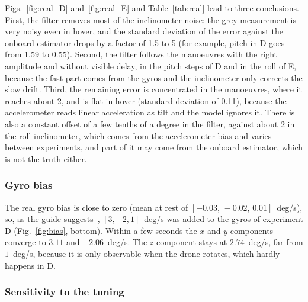 \documentclass[11pt,a4paper]{article}
\begin{document}
Figs.~\ref{fig:real_D} and~\ref{fig:real_E} and Table~\ref{tab:real} lead to three conclusions.
First, the filter removes most of the inclinometer noise: the grey measurement is very noisy even in hover, and the standard deviation of the error against the onboard estimator drops by a factor of 1.5 to 5 (for example, pitch in D goes from 1.59\textdegree{} to 0.55\textdegree).
Second, the filter follows the manoeuvres with the right amplitude and without visible delay, in the pitch steps of D and in the roll of E, because the fast part comes from the gyros and the inclinometer only corrects the slow drift.
Third, the remaining error is concentrated in the manoeuvres, where it reaches about 2\textdegree, and is flat in hover (standard deviation of 0.11\textdegree), because the accelerometer reads linear acceleration as tilt and the model ignores it.
There is also a constant offset of a few tenths of a degree in the filter, against about 2\textdegree{} in the roll inclinometer, which comes from the accelerometer bias and varies between experiments, and part of it may come from the onboard estimator, which is not the truth either.

\subsubsection{Gyro bias}

The real gyro bias is close to zero (mean at rest of $[-0.03,\,-0.02,\,0.01]$~deg/s), so, as the guide suggests~\cite{guia}, $[3,-2,1]$~deg/s was added to the gyros of experiment D (Fig.~\ref{fig:bias}, bottom).
Within a few seconds the $x$ and $y$ components converge to $3.11$ and $-2.06$~deg/s.
The $z$ component stays at $2.74$~deg/s, far from $1$~deg/s, because it is only observable when the drone rotates, which hardly happens in D.

\subsubsection{Sensitivity to the tuning}
\label{sec:sens}
\end{document}

